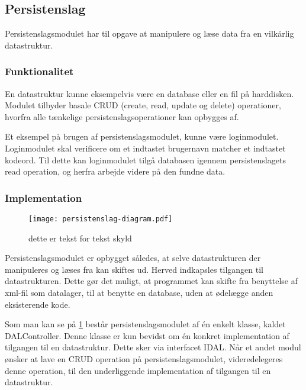 \subsection{Persistenslag}
\label{sub:persistenslag}

Persistenslagsmodulet har til opgave at manipulere og læse data fra en vilkårlig datastruktur.

\subsubsection{Funktionalitet}
\label{ssub:persistenslag_funktionalitet}

En datastruktur kunne eksempelvis være en database eller en fil på harddisken. Modulet tilbyder basale CRUD (create, read, update og delete) operationer, hvorfra alle tænkelige persistenslagsoperationer kan opbygges af.

Et eksempel på brugen af persistenslagsmodulet, kunne være loginmodulet. Loginmodulet skal verificere om et indtastet brugernavn matcher et indtastet kodeord. Til dette kan loginmodulet tilgå databasen igennem persistenslagets read operation, og herfra arbejde videre på den fundne data.

\subsubsection{Implementation}
\label{ssub:persistenslag_implementation}
\begin{figure}
  \centering
  \texttt{[image: persistenslag-diagram.pdf]}
  \caption{dette er tekst for tekst skyld }
  \label{fig:permod}
\end{figure}

Persistenslagsmodulet er opbygget således, at selve datastrukturen der manipuleres og læses fra kan skiftes ud. Herved indkapsles tilgangen til datastrukturen. Dette gør det muligt, at programmet kan skifte fra benyttelse af xml-fil som datalager, til at benytte en database, uden at ødelægge anden eksisterende kode.

Som man kan se på \cref{fig:permod} består persistenslagsmodulet af én enkelt klasse, kaldet DALController. Denne klasse er kun bevidst om én konkret implementation af tilgangen til en datastruktur. Dette sker via interfacet IDAL. Når et andet modul ønsker at lave en CRUD operation på persistenslagsmodulet, videredelegeres denne operation, til den underliggende implementation af tilgangen til en datastruktur.
